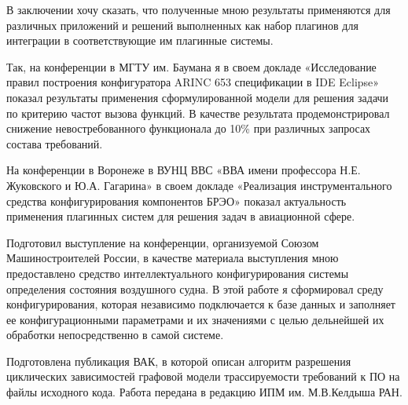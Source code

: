 
В заключении хочу сказать, что полученные мною результаты применяются для различных приложений и решений выполненных как набор плагинов для интеграции в соответствующие им плагинные системы.

Так, на конференции в МГТУ им. Баумана я в своем докладе «Исследование правил построения конфигуратора ARINC 653 спецификации в IDE Eclipse» показал результаты применения сформулированной модели для решения задачи по критерию частот вызова функций. В качестве результата продемонстрировал снижение невостребованного функционала до 10\% при различных запросах состава требований.

На конференции в Воронеже в ВУНЦ ВВС «ВВА имени профессора Н.Е. Жуковского и Ю.А. Гагарина» в своем докладе «Реализация инструментального средства конфигурирования компонентов БРЭО» показал актуальность применения плагинных систем для решения задач в авиационной сфере.

Подготовил выступление на конференции, организуемой Союзом Машиностроителей России, в качестве материала выступления мною предоставлено средство интеллектуального конфигурирования системы определения состояния воздушного судна. В этой работе я сформировал среду конфигурирования, которая независимо подключается к базе данных и заполняет ее конфигурационными параметрами и их значениями с целью дельнейшей их обработки непосредственно в самой системе.

Подготовлена публикация ВАК, в которой описан алгоритм разрешения циклических зависимостей графовой модели трассируемости требований к ПО на файлы исходного кода. Работа передана в редакцию ИПМ им. М.В.Келдыша РАН.
